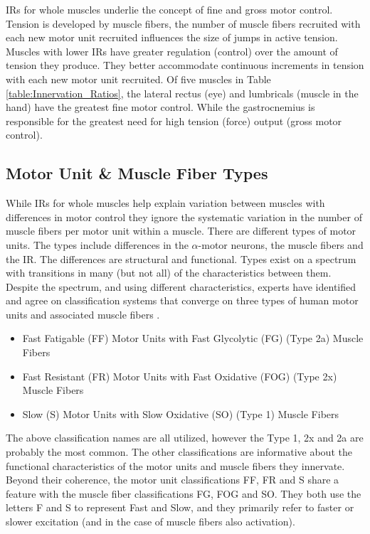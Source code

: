 IRs for whole muscles underlie the concept of fine and gross motor control. Tension is developed by muscle fibers, the number of muscle fibers recruited with each new motor unit recruited influences the size of jumps in active tension. Muscles with lower IRs have greater regulation (control) over the amount of tension they produce. They better accommodate continuous increments in tension with each new motor unit recruited. Of five muscles in Table \ref{table:Innervation_Ratios}, the lateral rectus (eye) and lumbricals (muscle in the hand) have the greatest fine motor control. While the gastrocnemius is responsible for the greatest need for high tension (force) output (gross motor control).

\subsection{Motor Unit \& Muscle Fiber Types}

While IRs for whole muscles help explain variation between muscles with differences in motor control they ignore the systematic variation in the number of muscle fibers per motor unit within a muscle. There are different types of motor units. The types include differences in the $\alpha$-motor neurons, the muscle fibers and the IR. The differences are structural and functional. Types exist on a spectrum with transitions in many (but not all) of the characteristics between them. Despite the spectrum, and using different characteristics, experts have identified and agree on classification systems that converge on three types of human motor units and associated muscle fibers \cite{lieber_skeletal_2010}.

\begin{itemize}
    \item Fast Fatigable (FF) Motor Units with Fast Glycolytic (FG) (Type 2a) Muscle Fibers
    \item Fast Resistant (FR) Motor Units with Fast Oxidative (FOG) (Type 2x) Muscle Fibers
    \item Slow (S) Motor Units with Slow Oxidative (SO) (Type 1) Muscle Fibers
\end{itemize}

The above classification names are all utilized, however the Type 1, 2x and 2a are probably the most common. The other classifications are informative about the functional characteristics of the motor units and muscle fibers they innervate. Beyond their coherence, the motor unit classifications FF, FR and S share a feature with the muscle fiber classifications FG, FOG and SO. They both use the letters F and S to represent Fast and Slow, and they primarily refer to faster or slower excitation (and in the case of muscle fibers also activation). 

